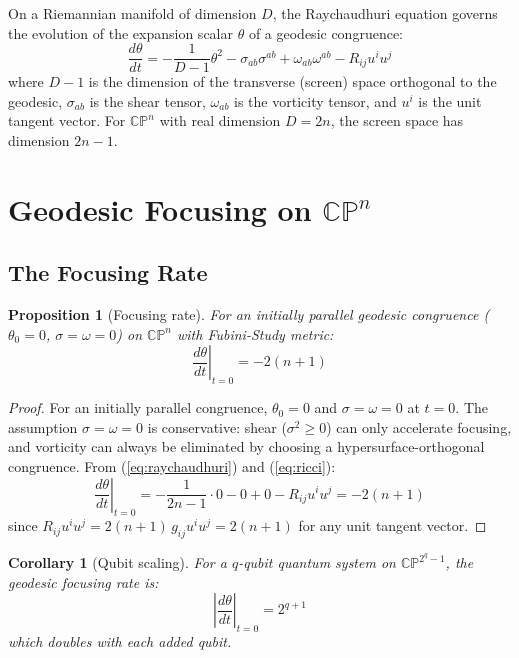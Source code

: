 \documentclass[12pt,a4paper]{article}
\newtheorem{proposition}{Proposition}
\newtheorem{corollary}{Corollary}
\begin{document}
On a Riemannian manifold of dimension $D$, the Raychaudhuri equation \cite{raychaudhuri1955} governs the evolution of the expansion scalar $\theta$ of a geodesic congruence:
\begin{equation}
    \frac{d\theta}{dt} = -\frac{1}{D-1}\theta^2 - \sigma_{ab}\sigma^{ab} + \omega_{ab}\omega^{ab} - R_{ij}u^i u^j
    \label{eq:raychaudhuri}
\end{equation}
where $D-1$ is the dimension of the transverse (screen) space orthogonal to the geodesic, $\sigma_{ab}$ is the shear tensor, $\omega_{ab}$ is the vorticity tensor, and $u^i$ is the unit tangent vector. For $\mathbb{CP}^n$ with real dimension $D = 2n$, the screen space has dimension $2n - 1$.

\section{Geodesic Focusing on $\mathbb{CP}^n$}
\label{sec:focusing}

\subsection{The Focusing Rate}

\begin{proposition}[Focusing rate]
\label{prop:focusing_rate}
For an initially parallel geodesic congruence ($\theta_0 = 0$, $\sigma = \omega = 0$) on $\mathbb{CP}^n$ with Fubini-Study metric:
\begin{equation}
    \left.\frac{d\theta}{dt}\right|_{t=0} = -2(n+1)
    \label{eq:focusing_rate}
\end{equation}
\end{proposition}

\begin{proof}
For an initially parallel congruence, $\theta_0 = 0$ and $\sigma = \omega = 0$ at $t = 0$. The assumption $\sigma = \omega = 0$ is conservative: shear ($\sigma^2 \geq 0$) can only accelerate focusing, and vorticity can always be eliminated by choosing a hypersurface-orthogonal congruence. From (\ref{eq:raychaudhuri}) and (\ref{eq:ricci}):
\[
\left.\frac{d\theta}{dt}\right|_{t=0} = -\frac{1}{2n-1} \cdot 0 - 0 + 0 - R_{ij}u^i u^j = -2(n+1)
\]
since $R_{ij}u^i u^j = 2(n+1)\,g_{ij}u^i u^j = 2(n+1)$ for any unit tangent vector.
\end{proof}

\begin{corollary}[Qubit scaling]
\label{cor:qubit_scaling}
For a $q$-qubit quantum system on $\mathbb{CP}^{2^q - 1}$, the geodesic focusing rate is:
\begin{equation}
    \left|\frac{d\theta}{dt}\right|_{t=0} = 2^{q+1}
\end{equation}
which doubles with each added qubit.
\end{corollary}
\end{document}
